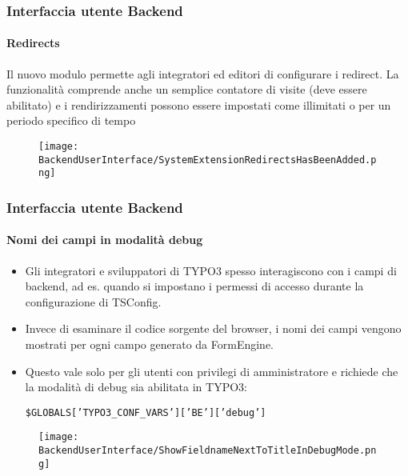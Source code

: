 
\begin{frame}[fragile]
	\frametitle{Interfaccia utente Backend}
	\framesubtitle{Redirects}

	Il nuovo modulo permette agli integratori ed editori di configurare i redirect.
	La funzionalità comprende anche un semplice contatore di visite (deve essere abilitato)
	e i rendirizzamenti possono essere impostati come illimitati o per un periodo specifico di tempo

	\begin{figure}
		\texttt{[image: BackendUserInterface/SystemExtensionRedirectsHasBeenAdded.png]}
	\end{figure}

\end{frame}


\begin{frame}[fragile]
	\frametitle{Interfaccia utente Backend}
	\framesubtitle{Nomi dei campi in modalità debug}

	\begin{itemize}

		\item Gli integratori e sviluppatori di TYPO3 spesso interagiscono con i campi di backend, ad es.
		quando si impostano i permessi di accesso durante la configurazione di TSConfig.

		\item Invece di esaminare il codice sorgente del browser, i nomi dei campi vengono mostrati
		per ogni campo generato da FormEngine.

		\item Questo vale solo per gli utenti con privilegi di amministratore e richiede che la modalità
			di debug sia abilitata in TYPO3:

			\smaller
				\texttt{\$GLOBALS['TYPO3\_CONF\_VARS']['BE']['debug']}
			\normalsize

	\end{itemize}

	\begin{figure}
		\texttt{[image: BackendUserInterface/ShowFieldnameNextToTitleInDebugMode.png]}
	\end{figure}

\end{frame}

